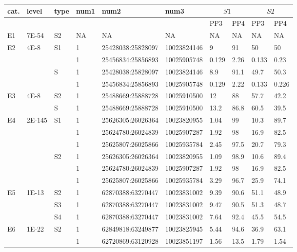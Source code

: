 \documentclass[a4paper,12pt]{article}
\begin{document}
\footnotesize  %

\begin{longtable}{@{\extracolsep{\fill}}llllllllll@{}}
  \hline\hline %
   cat. & level & type & num1 & num2 & num3 & \multicolumn{2}{c}{$S1$} & \multicolumn{2}{c}{$S2$} \\ [0.5ex] 
    \hline %
 &  &  &  &  &  & PP3 & PP4 & PP3 & PP4 \\
E1 & 7E-54 & S2 & NA & NA & NA & NA & NA & NA & NA \\
E2 & 4E-8 & S1 & 1 & 25428038:25828097 & 10023824146 & 9 & 91 & 50 & 50 \\
 &  &  & 1 & 25456834:25856893 & 10025905748 & 0.129 & 2.26 & 0.133 & 0.23 \\
&  & S & 1 & 25428038:25828097 & 10023824146 & 8.9 & 91.1 & 49.7 & 50.3 \\
 &  &  & 1 & 25456834:25856893 & 10025905748 & 0.129 & 2.22 & 0.133 & 0.226 \\
E3 & 4E-8 & S2 & 1 & 25488669:25888728 & 10025910500 & 12 & 88 & 57.7 & 42.2 \\
 &  & S & 1 & 25488669:25888728 & 10025910500 & 13.2 & 86.8 & 60.5 & 39.5 \\
E4 & 2E-145 & S1 & 1 & 25626305:26026364 & 10023820955 & 1.04 & 99 & 10.3 & 89.7 \\
 &  &  & 1 & 25624780:26024839 & 10025907287 & 1.92 & 98 & 16.9 & 82.5 \\
 &  &  & 1 & 25625807:26025866 & 10025935784 & 2.45 & 97.5 & 20.7 & 79.3 \\
 &  & S2 & 1 & 25626305:26026364 & 10023820955 & 1.09 & 98.9 & 10.6 & 89.4 \\
 &  &  & 1 & 25624780:26024839 & 10025907287 & 1.92 & 98 & 16.9 & 82.5 \\
 &  &  & 1 & 25625807:26025866 & 10025935784 & 3.29 & 96.7 & 25.9 & 74.1 \\
E5 & 1E-13 & S2 & 1 & 62870388:63270447 & 10023831002 & 9.39 & 90.6 & 51.1 & 48.9 \\
 &  & S3 & 1 & 62870388:63270447 & 10023831002 & 9.47 & 90.5 & 51.3 & 48.7 \\
 &  & S4 & 1 & 62870388:63270447 & 10023831002 & 7.64 & 92.4 & 45.5 & 54.5 \\
E6 & 1E-22 & S2 & 1 & 62849818:63249877 & 10023825945 & 5.44 & 94.6 & 36.9 & 63.1 \\
 &  &  & 1 & 62720869:63120928 & 10023851197 & 1.56 & 13.5 & 1.79 & 1.54 \\

\end{longtable}
\end{document}
